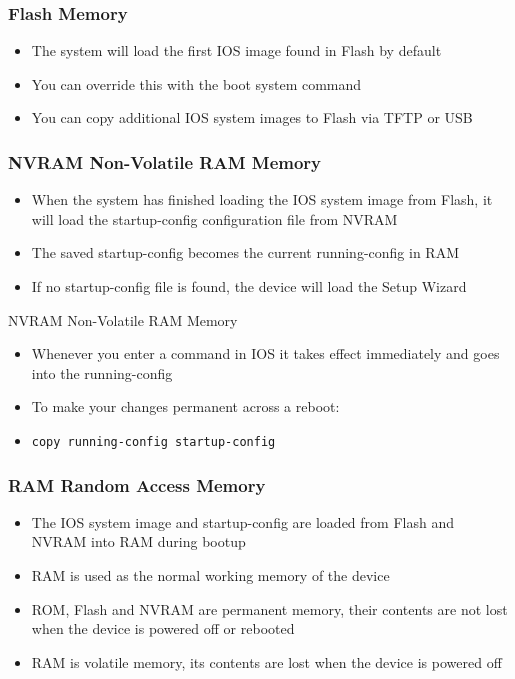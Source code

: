 \documentclass[pdflatex,compress,mathserif]{beamer}
\begin{document}
\begin{frame}
	\frametitle{Flash Memory}
	\begin{itemize}
		\item The system will load the first IOS image found in Flash by default
		\item You can override this with the boot system command
		\item You can copy additional IOS system images to Flash via TFTP or USB
	\end{itemize}
\end{frame}

\begin{frame}
	\frametitle{NVRAM Non-Volatile RAM Memory}
	\begin{itemize}
		\item When the system has finished loading the IOS system image from Flash, it will load the startup-config configuration file from NVRAM
		\item The saved startup-config becomes the current running-config in RAM
		\item If no startup-config file is found, the device will load the Setup Wizard
	\end{itemize}
\end{frame}

\begin{frame}{NVRAM Non-Volatile RAM Memory}
	\begin{itemize}
		\item Whenever you enter a command in IOS it takes effect immediately and goes into the running-config
		\item To make your changes permanent across a reboot:
		\item[] \texttt{copy running-config startup-config}
	\end{itemize}
\end{frame}

\begin{frame}
	\frametitle{RAM Random Access Memory}
	\begin{itemize}
		\item The IOS system image and startup-config are loaded from Flash and NVRAM into RAM during bootup
		\item RAM is used as the normal working memory of the device
		\item ROM, Flash and NVRAM are permanent memory, their contents are not lost when the device is powered off or rebooted
		\item RAM is volatile memory, its contents are lost when the device is powered off
	\end{itemize}
\end{frame}
\end{document}
